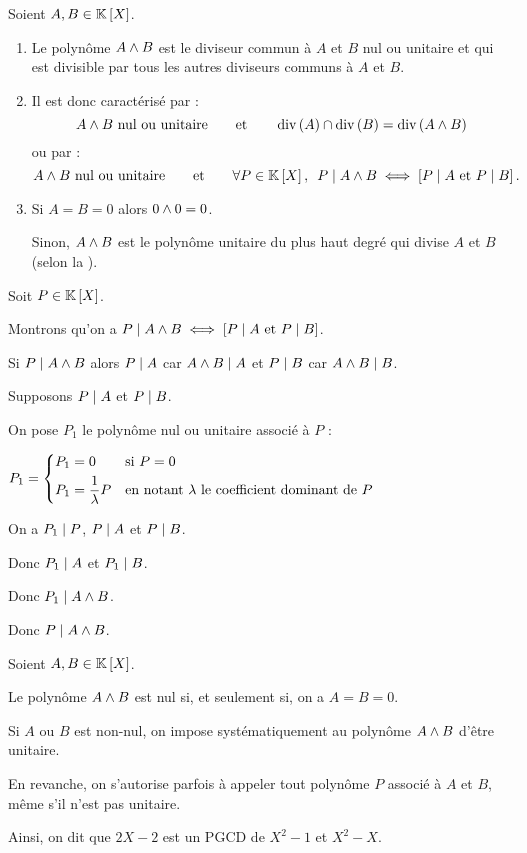 \begin{rem}
Soient \(A,B\in\poly\).

\begin{enumerate}
\item Le polynôme \(A\land B\) est le diviseur commun à \(A\) et \(B\) nul ou unitaire et qui est divisible par tous les autres diviseurs communs à \(A\) et \(B\). \\

\item Il est donc caractérisé par : \[A\land B\text{ nul ou unitaire}\qquad\text{et}\qquad\operatorname{div}\left(A\right)\cap\operatorname{div}\left(B\right)=\operatorname{div}\left(A\land B\right)\] ou par : \[A\et B\text{ nul ou unitaire}\qquad\text{et}\qquad\quantifs{\forall P\in\poly}P\divise A\et B\ssi\croch{P\divise A\text{ et }P\divise B}.\]

\item Si \(A=B=0\) alors \(0\land0=0\).

Sinon, \(A\land B\) est le polynôme unitaire du plus haut degré qui divise \(A\) et \(B\) (selon la ).
\end{enumerate}
\end{rem}

\begin{dem}[2]
Soit \(P\in\poly\).

Montrons qu'on a \(P\mid A\land B\iff\left[P\mid A\text{ et }P\mid B\right]\).

\impdir Si \(P\mid A\land B\) alors \(P\mid A\) car \(A\land B\mid A\) et \(P\mid B\) car \(A\land B\mid B\).

\imprec

Supposons \(P\mid A\) et \(P\mid B\).

On pose \(P_1\) le polynôme nul ou unitaire associé à \(P\) :

\(P_1=\begin{dcases}P_1=0 &\text{si }P=0 \\ P_1=\dfrac{1}{\lambda}P &\text{en notant }\lambda\text{ le coefficient dominant de }P\end{dcases}\)

On a \(P_1\mid P\), \(P\mid A\) et \(P\mid B\).

Donc \(P_1\mid A\) et \(P_1\mid B\).

Donc \(P_1\mid A\land B\).

Donc \(P\mid A\land B\).
\end{dem}

\begin{rem}
Soient \(A,B\in\poly\).

Le polynôme \(A\land B\) est nul si, et seulement si, on a \(A=B=0\).

Si \(A\) ou \(B\) est non-nul, on impose systématiquement au polynôme \(A\land B\) d'être unitaire.

En revanche, on s'autorise parfois à appeler  tout polynôme \(P\) associé à \(A\) et \(B\), même s'il n'est pas unitaire.

Ainsi, on dit que \(2X-2\) est un PGCD de \(X^2-1\) et \(X^2-X\).
\end{rem}

